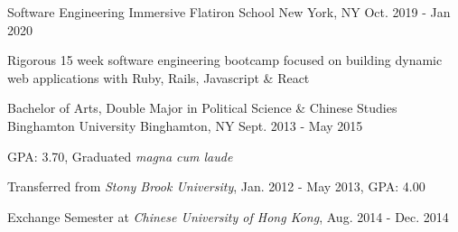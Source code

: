 
\begin{cventries}

  \cventry
    {Software Engineering Immersive} %
    {Flatiron School\vspace{-2.0mm}} %
    {New York, NY\vspace{-2.0mm}} %
    {Oct. 2019 - Jan 2020} %
    {
      \begin{cvitems} %
        \item {Rigorous 15 week software engineering bootcamp focused on building dynamic web applications with Ruby, Rails, Javascript \& React}
      \end{cvitems}
  }


  \cventry
    {Bachelor of Arts, Double Major in Political Science \& Chinese Studies} %
    {Binghamton University\vspace{-2.0mm}} %
    {Binghamton, NY\vspace{-2.0mm}} %
    {Sept. 2013 - May 2015} %
    {
      \begin{cvitems} %
        \item {GPA: 3.70, Graduated \textit{magna cum laude}}
        \item {Transferred from \textit{Stony Brook University}, Jan. 2012 - May 2013, GPA: 4.00}
        \item {Exchange Semester at \textit{Chinese University of Hong Kong}, Aug. 2014 - Dec. 2014}
      \end{cvitems}
    }



\end{cventries}
